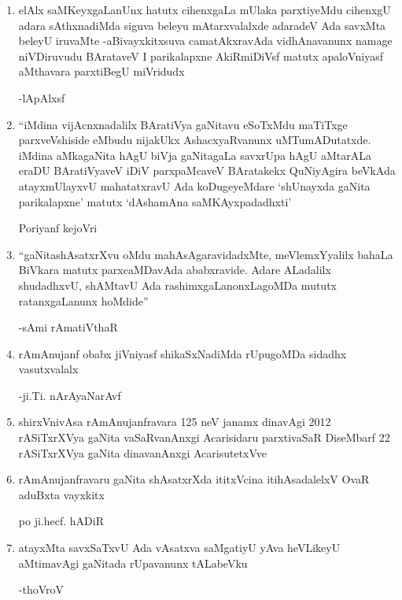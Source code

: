 \begin{enumerate}[\rm 1)]
\item elAlx saMKeyxgaLanUnx hatutx cihenxgaLa mUlaka parxtiyeMdu cihenxgU adara sAthxnadiMda siguva beleyu mAtarxvalalxde adaradeV Ada savxMta beleyU iruvaMte -aBivayxkitxsuva camatAkxravAda vidhAnavanunx namage niVDiruvudu BArataveV I parikalapxne AkiRmiDiVsf matutx apaloVniyasf aMthavara parxtiBegU miVridudx
\begin{flushright}
-lApAlxsf
\end{flushright}


\item ``iMdina vijAcnxnadalilx BAratiVya gaNitavu eSoTxMdu maTiTxge parxveVshiside eMbudu nijakUkx AshacxyaRvanunx uMTumADutatxde. iMdina aMkagaNita hAgU biVja gaNitagaLa savxrUpa hAgU aMtarALa eraDU BAratiVyaveV iDiV parxpaMcaveV BAratakekx QuNiyAgira beVkAda atayxmUlayxvU mahatatxravU Ada koDugeyeMdare `shUnayxda gaNita parikalapxne' matutx `dAshamAna saMKAyxpadadhxti'
 \begin{flushright}
Poriyanf kejoVri
\end{flushright}

\item ``gaNitashAsatxrXvu oMdu mahAsAgaravidadxMte, meVlemxYyalilx bahaLa BiVkara matutx parxcaMDavAda ababxravide. Adare ALadalilx shudadhxvU, shAMtavU Ada rashimxgaLanonxLagoMDa mututx ratanxgaLanunx hoMdide''
\begin{flushright}
-sAmi rAmatiVthaR
\end{flushright}

\item rAmAnujanf obabx jiVniyasf shikaSxNadiMda rUpugoMDa sidadhx vasutxvalalx 
\begin{flushright}
-ji.Ti. nArAyaNarAvf
\end{flushright}

\item shirxVnivAsa rAmAnujanfravara {\rm 125} neV janamx dinavAgi {\rm 2012} rASiTxrXVya gaNita vaSaRvanAnxgi Acarisidaru parxtivaSaR DiseMbarf {\rm 22} rASiTxrXVya gaNita dinavanAnxgi AcarisutetxVve

\item rAmAnujanfravaru gaNita shAsatxrXda ititxVcina itihAsadalelxV OvaR aduBxta vayxkitx 
\begin{flushright}
po ji.hecf. hADiR
\end{flushright}

\item atayxMta savxSaTxvU Ada vAsatxva saMgatiyU yAva heVLikeyU aMtimavAgi gaNitada rUpavanunx tALabeVku
\begin{flushright}
-thoVroV
\end{flushright}


\end{enumerate}
